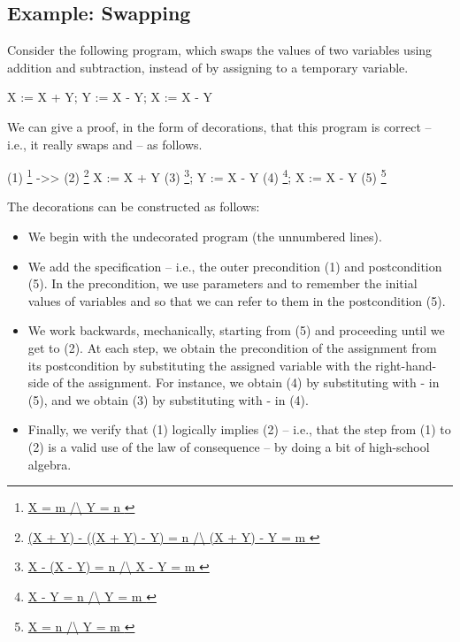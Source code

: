 \documentclass[12pt]{report}
\begin{document}
\subsection{Example: Swapping}



 Consider the following program, which swaps the values of two
    variables using addition and subtraction, instead of by assigning
    to a temporary variable.


       X := X + Y;
       Y := X - Y;
       X := X - Y


    We can give a proof, in the form of decorations, that this program is
    correct -- i.e., it really swaps  and  -- as follows.


    (1)    \footnote{\url{ X = m /\ Y = n }} ->>
    (2)    \footnote{\url{ (X + Y) - ((X + Y) - Y) = n /\ (X + Y) - Y = m }}
             X := X + Y
    (3)                     \footnote{\url{ X - (X - Y) = n /\ X - Y = m }};
             Y := X - Y
    (4)                     \footnote{\url{ X - Y = n /\ Y = m }};
             X := X - Y
    (5)    \footnote{\url{ X = n /\ Y = m }}


    The decorations can be constructed as follows:



\begin{itemize}
\item  We begin with the undecorated program (the unnumbered lines).



\item  We add the specification -- i.e., the outer precondition (1)
        and postcondition (5). In the precondition, we use parameters
         and  to remember the initial values of variables 
        and  so that we can refer to them in the postcondition (5).



\item  We work backwards, mechanically, starting from (5) and
        proceeding until we get to (2). At each step, we obtain the
        precondition of the assignment from its postcondition by
        substituting the assigned variable with the right-hand-side of
        the assignment. For instance, we obtain (4) by substituting
         with  -  in (5), and we obtain (3) by substituting 
        with  -  in (4).



\item  Finally, we verify that (1) logically implies (2) -- i.e., that
        the step from (1) to (2) is a valid use of the law of
        consequence -- by doing a bit of high-school algebra.

\end{itemize}
 
\end{document}
